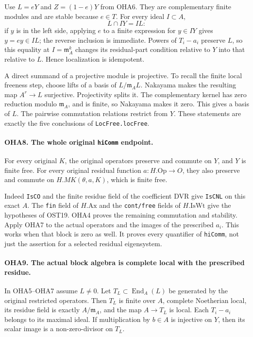 \documentclass[11pt,a4paper]{article}
\numberwithin{equation}{section}
\theoremstyle{remark}\newtheorem{remark}[theorem]{Remark}
\begin{document}
Use \(L=eY\) and \(Z=(1-e)Y\) from OHA6. They are complementary
finite modules and are stable because \(e\in T\). For every ideal
\(I\subset A\),
\[
                       L\cap IY=IL:
\]
if \(y\) is in the left side, applying \(e\) to a finite expression
for \(y\in IY\) gives \(y=ey\in IL\); the reverse inclusion is
immediate. Powers of \(T_i-a_i\) preserve \(L\), so this equality
at \(I=\mathfrak m_A^k\) changes its residual-part condition
relative to \(Y\) into that relative to \(L\). Hence localization
is idempotent.

A direct summand of a projective module is projective. To recall
the finite local freeness step, choose lifts of a basis of
\(L/\mathfrak m_AL\). Nakayama makes the resulting map
\(A^r\to L\) surjective. Projectivity splits it. The complementary
kernel has zero reduction modulo \(\mathfrak m_A\), and is finite,
so Nakayama makes it zero. This gives a basis of \(L\).
The pairwise commutation relations restrict from \(Y\).
These statements are exactly the five conclusions of
\texttt{Loc\allowbreak Free.\allowbreak loc\allowbreak Free}.

\paragraph{OHA8. The whole original \texttt{hi\allowbreak Comm} endpoint.}
\label{claim:OHA8}
For every original \(K\), the original operators preserve and
commute on \(Y\), and \(Y\) is finite free. For every original
residual function \(a:H.\mathrm{Op}\to O\), they also preserve
and commute on \(H.MK(\theta,\allowbreak{} a,\allowbreak{} K)\), which is finite free.

Indeed \texttt{Is\allowbreak CO} and the finite residue field of the
coefficient DVR give \texttt{Is\allowbreak CNL} on this exact \(A\).
The \texttt{fin} field of \(H.\mathrm{Ax}\) and the
\texttt{cont/\allowbreak free} fields of \(H.\mathrm{IsWt}\) give the
hypotheses of OST19. OHA4 proves the remaining commutation
and stability. Apply OHA7 to the actual operators and the
images of the prescribed \(a_i\). This works when that block
is zero as well. It proves every quantifier of \texttt{hi\allowbreak Comm},
not just the assertion for a selected residual eigensystem.

\paragraph{OHA9. The actual block algebra is complete local with the prescribed residue.}
\label{claim:OHA9}
In OHA5--OHA7 assume \(L\ne0\). Let \(T_L\subset
\operatorname{End}_A(L)\) be generated by the original restricted
operators. Then \(T_L\) is finite over \(A\), complete Noetherian
local, its residue field is exactly \(A/\mathfrak m_A\), and
the map \(A\to T_L\) is local. Each \(T_i-a_i\) belongs to
its maximal ideal. If multiplication by \(b\in A\) is injective
on \(Y\), then its scalar image is a non-zero-divisor on \(T_L\).
\end{document}
